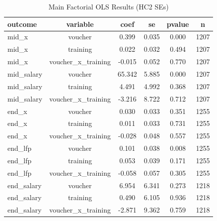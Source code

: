 \begin{table}[htbp]
\centering
\caption{Main Factorial OLS Results (HC2 SEs)}
\label{tab:main}
\begin{tabular}{lccccc}
\hline\hline
outcome & variable & coef & se & pvalue & n \\
\hline
mid\_x & voucher & 0.399 & 0.035 & 0.000 & 1207 \\
mid\_x & training & 0.022 & 0.032 & 0.494 & 1207 \\
mid\_x & voucher\_x\_training & -0.015 & 0.052 & 0.770 & 1207 \\
mid\_salary & voucher & 65.342 & 5.885 & 0.000 & 1207 \\
mid\_salary & training & 4.491 & 4.992 & 0.368 & 1207 \\
mid\_salary & voucher\_x\_training & -3.216 & 8.722 & 0.712 & 1207 \\
end\_x & voucher & 0.030 & 0.033 & 0.351 & 1255 \\
end\_x & training & 0.011 & 0.033 & 0.731 & 1255 \\
end\_x & voucher\_x\_training & -0.028 & 0.048 & 0.557 & 1255 \\
end\_lfp & voucher & 0.101 & 0.038 & 0.008 & 1255 \\
end\_lfp & training & 0.053 & 0.039 & 0.171 & 1255 \\
end\_lfp & voucher\_x\_training & -0.058 & 0.057 & 0.305 & 1255 \\
end\_salary & voucher & 6.954 & 6.341 & 0.273 & 1218 \\
end\_salary & training & 0.490 & 6.105 & 0.936 & 1218 \\
end\_salary & voucher\_x\_training & -2.871 & 9.362 & 0.759 & 1218 \\
\hline\hline
\end{tabular}
\end{table}